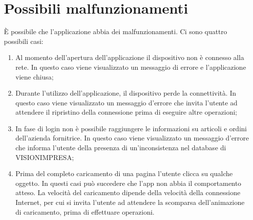 \section{Possibili malfunzionamenti}

È possibile che l'applicazione abbia dei malfunzionamenti. Ci sono quattro possibili casi:
	\begin{enumerate}
		\item Al momento dell'apertura dell'applicazione il dispositivo non è connesso alla rete. In questo caso viene visualizzato un messaggio di errore e l'applicazione viene chiusa;
		\item Durante l'utilizzo dell'applicazione, il dispositivo perde la connettività. In questo caso viene visualizzato un messaggio d'errore che invita l'utente ad attendere il ripristino della connessione prima di eseguire altre operazioni;
		\item In fase di login non è possibile raggiungere le informazioni su articoli e ordini dell'azienda fornitrice. In questo caso viene visualizzato un messaggio d'errore che informa l'utente della presenza di un'inconsistenza nel database di VISIONIMPRESA;
		\item Prima del completo caricamento di una pagina l'utente clicca su qualche oggetto. In questi casi può succedere che l'app non abbia il comportamento atteso. La velocità del caricamento dipende della velocità della connessione Internet, per cui si invita l'utente ad attendere la scomparsa dell'animazione di caricamento, prima di effettuare operazioni.
	\end{enumerate}
	

